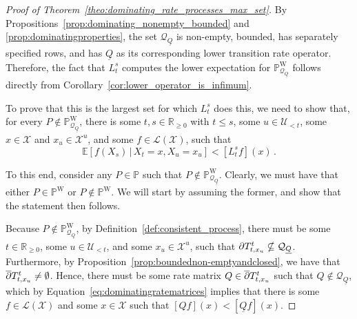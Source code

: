\documentclass[10pt,a4paper]{paper}
\theoremstyle{definition}
\newcommand{\reals}{\mathbb{R}}
\newcommand{\realsnonneg}{\reals_{\geq 0}}
\newcommand{\states}{\mathcal{X}}
\newcommand{\processes}{\mathbb{P}}
\newcommand{\wprocesses}{\processes^{\mathrm{W}}}
\newcommand{\gambles}{\mathcal{L}}
\newcommand{\gamblesX}{\gambles(\states)}
\newcommand{\rateset}{\mathcal{Q}}
\newcommand{\lrate}{\underline{Q}}
\begin{document}
\begin{proof}[Proof of Theorem~\ref{theo:dominating_rate_processes_max_set}]
By Propositions~\ref{prop:dominating_nonempty_bounded} and \ref{prop:dominatingproperties}, the set $\rateset_{\lrate}$ is non-empty, bounded, has separately specified rows, and has $\lrate$ as its corresponding lower transition rate operator. Therefore, the fact that $L_t^s$ computes the lower expectation for $\wprocesses_{\rateset_{\lrate}}$ follows directly from Corollary~\ref{cor:lower_operator_is_infimum}.

To prove that this is the largest set for which $L_t^s$ does this, we need to show that, for every $P\notin \wprocesses_{\rateset_{\lrate}}$, there is some $t,s\in\realsnonneg$ with $t\leq s$, some $u\in\mathcal{U}_{<t}$, some $x\in\states$ and $x_u\in\states^u$, and some $f\in\gamblesX$, such that
\begin{equation}\label{theo:largest_set_outside_process_lower}
\mathbb{E}[f(X_s)\,\vert\,X_t=x,X_u=x_u] < [L_t^sf](x)\,.
\end{equation}

To this end, consider any $P\in\processes$ such that $P\notin\wprocesses_{\rateset_{\lrate}}$. Clearly, we must have that either $P\in\wprocesses$ or $P\notin\wprocesses$. We will start by assuming the former, and show that the statement then follows.

Because $P\notin\wprocesses_{\rateset_{\lrate}}$, by Definition~\ref{def:consistent_process}, there must be some $t\in\realsnonneg$, some $u\in\mathcal{U}_{<t}$, and some $x_u\in\states^u$, such that $\smash{\overline{\partial}}T_{t,x_u}^{t}\nsubseteq\rateset_{\lrate}$. Furthermore, by Proposition~\ref{prop:boundednon-emptyandclosed}, we have that $\smash{\overline{\partial}}T_{t,x_u}^{t}\neq\emptyset$. Hence, there must be some rate matrix $Q\in\smash{\overline{\partial}}T_{t,x_u}^{t}$ such that $Q\notin\rateset_{\lrate}$, which by Equation~\eqref{eq:dominatingratematrices} implies that there is some $f\in\gamblesX$ and some $x\in\states$ such that $\left[Qf\right](x)<\left[\lrate f\right](x)$.


\end{proof}
\end{document}
